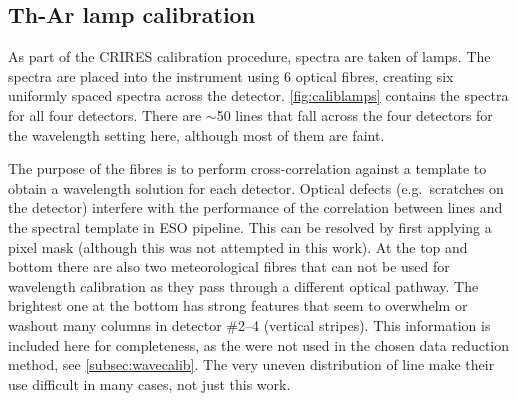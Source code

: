 \subsection{Th-Ar lamp calibration}
\label{subsec:th-ar}
As part of the {CRIRES} calibration procedure, spectra are taken of \thar{} lamps.
The \thar{} spectra are placed into the instrument using 6 optical fibres, creating six uniformly spaced spectra across the detector.
\cref{fig:caliblamps} contains the \thar{} spectra for all four detectors.
There are \(\sim\)50 \thar{} lines that fall across the four detectors for the wavelength setting here, although most of them are faint.

The purpose of the \thar{} fibres is to perform cross-correlation against a \thar{} template to obtain a wavelength solution for each detector.
Optical defects (e.g.\ scratches on the detector) interfere with the performance of the correlation between \thar{} lines and the spectral template in {ESO} pipeline.
This can be resolved by first applying a pixel mask (although this was not attempted in this work).
At the top and bottom there are also two meteorological fibres that can not be used for wavelength calibration as they pass through a different optical pathway.
The brightest one at the bottom has strong features that seem to overwhelm or washout many columns in detector \#2--4 (vertical stripes).
This information is included here for completeness, as the \thar{} were not used in the chosen data reduction method, see \cref{subsec:wavecalib}.
The very uneven distribution of \thar{} line make their use difficult in many cases, not just this work.


